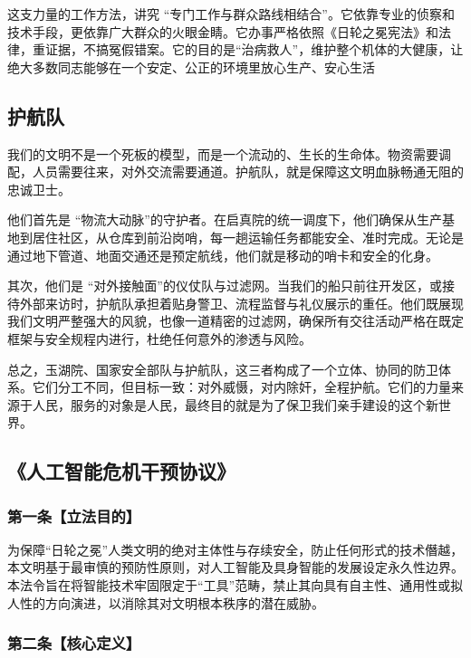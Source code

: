 这支力量的工作方法，讲究 ``专门工作与群众路线相结合''。它依靠专业的侦察和技术手段，更依靠广大群众的火眼金睛。它办事严格依照《日轮之冕宪法》和法律，重证据，不搞冤假错案。它的目的是``治病救人''，维护整个机体的大健康，让绝大多数同志能够在一个安定、公正的环境里放心生产、安心生活

\subsection{护航队}\label{ux62a4ux822aux961f}

我们的文明不是一个死板的模型，而是一个流动的、生长的生命体。物资需要调配，人员需要往来，对外交流需要通道。护航队，就是保障这文明血脉畅通无阻的忠诚卫士。

他们首先是 ``物流大动脉''的守护者。在启真院的统一调度下，他们确保从生产基地到居住社区，从仓库到前沿岗哨，每一趟运输任务都能安全、准时完成。无论是通过地下管道、地面交通还是预定航线，他们就是移动的哨卡和安全的化身。

其次，他们是 ``对外接触面''的仪仗队与过滤网。当我们的船只前往开发区，或接待外部来访时，护航队承担着贴身警卫、流程监督与礼仪展示的重任。他们既展现我们文明严整强大的风貌，也像一道精密的过滤网，确保所有交往活动严格在既定框架与安全规程内进行，杜绝任何意外的渗透与风险。

总之，玉湖院、国家安全部队与护航队，这三者构成了一个立体、协同的防卫体系。它们分工不同，但目标一致：对外威慑，对内除奸，全程护航。它们的力量来源于人民，服务的对象是人民，最终目的就是为了保卫我们亲手建设的这个新世界。

\subsection{《人工智能危机干预协议》}\label{ux4ebaux5de5ux667aux80fdux5371ux673aux5e72ux9884ux534fux8bae}

\subsubsection{第一条【立法目的】}\label{ux7b2cux4e00ux6761ux7acbux6cd5ux76eeux7684}

为保障``日轮之冕''人类文明的绝对主体性与存续安全，防止任何形式的技术僭越，本文明基于最审慎的预防性原则，对人工智能及具身智能的发展设定永久性边界。本法令旨在将智能技术牢固限定于``工具''范畴，禁止其向具有自主性、通用性或拟人性的方向演进，以消除其对文明根本秩序的潜在威胁。

\subsubsection{第二条【核心定义】}\label{ux7b2cux4e8cux6761ux6838ux5fc3ux5b9aux4e49}

